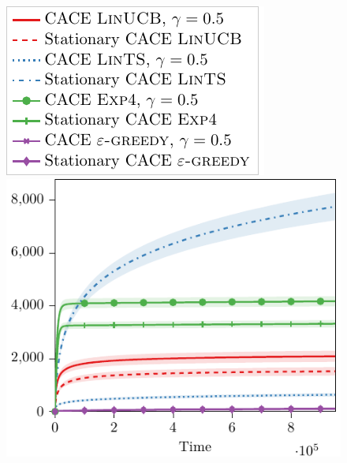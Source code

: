 \begin{figure}
    \centering
    \begin{minipage}{0.25\linewidth}
        \centering
        \includegraphics[width=0.85\linewidth]{sections/appendix/nips2020-bandits/images/attack_reward/simulations/legend.pdf}
    \end{minipage}\hfill
    \begin{minipage}{0.25\linewidth}
    \centering
    \includegraphics[width=0.95\linewidth]{sections/appendix/nips2020-bandits/images/attack_reward/simulations/cost_attack_reward_simulations.pdf}
    \end{minipage}\hfill
    \begin{minipage}{0.25\linewidth}
    \centering

\end{minipage}
\end{figure}

